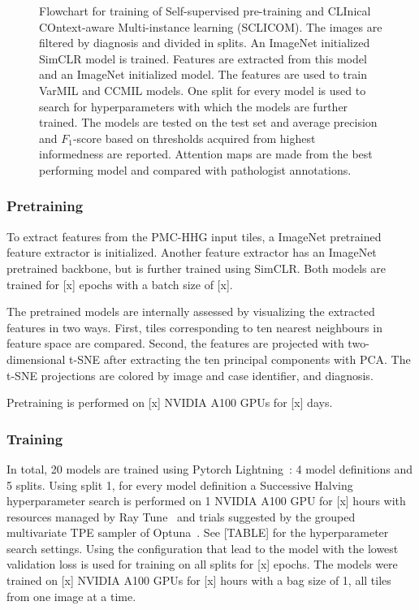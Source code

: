 \begin{figure}
    \caption[Flowchart of training SCLICOM.]{
        Flowchart for training of Self-supervised pre-training and CLInical COntext-aware Multi-instance learning (SCLICOM).
        The images are filtered by diagnosis and divided in splits.
        An ImageNet initialized SimCLR model is trained.
        Features are extracted from this model and an ImageNet initialized model.
        The features are used to train VarMIL and CCMIL models.
        One split for every model is used to search for hyperparameters with which the models are further trained.
        The models are tested on the test set and average precision and $F_1$-score based on thresholds acquired from highest informedness are reported.
        Attention maps are made from the best performing model and compared with pathologist annotations.
    }
\end{figure}

\subsubsection{Pretraining}
To extract features from the PMC-HHG input tiles, a ImageNet pretrained feature extractor is initialized.
Another feature extractor has an ImageNet pretrained backbone, but is further trained using SimCLR.
Both models are trained for [x] epochs with a batch size of [x].

The pretrained models are internally assessed by visualizing the extracted features in two ways.
First, tiles corresponding to ten nearest neighbours in feature space are compared.
Second, the features are projected with two-dimensional t-SNE after extracting the ten principal components with PCA.
The t-SNE projections are colored by image and case identifier, and diagnosis.

Pretraining is performed on [x] NVIDIA A100 GPUs for [x] days.

\subsubsection{Training}
In total, 20 models are trained using Pytorch Lightning~\cite{Falcon2019}: 4 model definitions and 5 splits.
Using split 1, for every model definition a Successive Halving hyperparameter search is performed on 1 NVIDIA A100 GPU for [x] hours with resources managed by Ray Tune~\cite{Liaw2018} and trials suggested by the grouped multivariate TPE sampler of Optuna~\cite{Akiba2019}.
See [TABLE] for the hyperparameter search settings.
Using the configuration that lead to the model with the lowest validation loss is used for training on all splits for [x] epochs.
The models were trained on [x] NVIDIA A100 GPUs for [x] hours with a bag size of 1, \ie all tiles from one image at a time.

